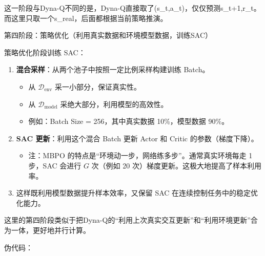 这一阶段与Dyna-Q不同的是，Dyna-Q直接取了(s\_t,a\_t)，仅仅预测s\_t+1,r\_t。而这里只取一个s\_real，后面都根据当前策略推演。

第四阶段：策略优化（利用真实数据和环境模型数据，训练SAC）

策略优化阶段训练 SAC：

\begin{enumerate}
\def\labelenumi{\arabic{enumi}.}
\tightlist
\item
  \textbf{混合采样}：从两个池子中按照一定比例采样构建训练 Batch。

  \begin{itemize}
  \tightlist
  \item
    从 \(\mathcal D_{\mathrm{env}}\) 采一小部分，保证真实性。
  \item
    从 \(\mathcal D_{\mathrm{model}}\) 采绝大部分，利用模型的高效性。
  \item
    例如：Batch Size = 256，其中真实数据 10\%，模型数据 90\%。
  \end{itemize}
\item
  \textbf{SAC 更新}：利用这个混合 Batch 更新 Actor 和 Critic 的参数（梯度下降）。

  \begin{itemize}
  \tightlist
  \item
    注：MBPO 的特点是``环境动一步，网络练多步''。通常真实环境每走 1 步，SAC 会进行 \(G\) 次（例如 20 次）梯度更新。这极大地提高了样本利用率。
  \end{itemize}
\item
  这样既利用模型数据提升样本效率，又保留 SAC 在连续控制任务中的稳定优化能力。
\end{enumerate}

这里的第四阶段类似于把Dyna-Q的``利用上次真实交互更新''和``利用环境更新''合为一体，更好地并行计算。

伪代码：


